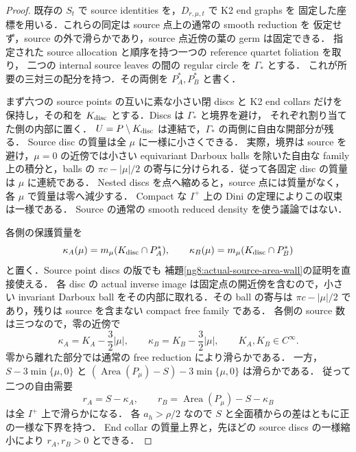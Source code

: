 \begin{proof}
既存の $S_t$ で source identities を，$D_{r,\mu,t}$ で K2 end graphs を
固定した座標を用いる．これらの同定は source 点上の通常の smooth reduction を
仮定せず，source の外で滑らかであり，source 点近傍の葉の germ は固定できる．
指定された source allocation と順序を持つ一つの reference quartet foliation を取り，
二つの internal source leaves の間の regular circle を $\Gamma_*$ とする．
これが所要の三対三の配分を持つ．その両側を $P_A^*,P_B^*$ と書く．

まず六つの source points の互いに素な小さい閉 discs と K2 end collars だけを
保持し，その和を $K_{\rm disc}$ とする．Discs は $\Gamma_*$ と境界を避け，
それぞれ割り当てた側の内部に置く．
$U=P\setminus K_{\rm disc}$ は連結で，$\Gamma_*$ の両側に自由な開部分が残る．
Source disc の質量は全 $\mu$ に一様に小さくできる．
実際，境界は source を避け，$\mu=0$ の近傍では小さい equivariant Darboux balls
を除いた自由な family 上の積分と，balls の
$\pi c-|\mu|/2$ の寄与に分けられる．従って各固定 disc の質量は $\mu$ に連続である．
Nested discs を点へ縮めると，source 点には質量がなく，各 $\mu$ で質量は零へ減少する．
Compact な $I^+$ 上の Dini の定理によりこの収束は一様である．
Source の通常の smooth reduced density を使う議論ではない．

各側の保護質量を
\[
 \kappa_A(\mu)=m_\mu(K_{\rm disc}\cap P_A^*),\qquad
 \kappa_B(\mu)=m_\mu(K_{\rm disc}\cap P_B^*)
\]
と置く．Source point discs の版でも
補題\ref{ng8:actual-source-area-wall}の証明を直接使える．
各 disc の actual inverse image は固定点の開近傍を含むので，小さい invariant
Darboux ball をその内部に取れる．その ball の寄与は
$\pi c-|\mu|/2$ であり，残りは source を含まない compact free family である．
各側の source 数は三つなので，零の近傍で
\[
 \kappa_A=K_A-\frac32|\mu|,\qquad
 \kappa_B=K_B-\frac32|\mu|,\qquad K_A,K_B\in C^\infty .
\]
零から離れた部分では通常の free reduction により滑らかである．
一方，$S-3\min\{\mu,0\}$ と
$(\operatorname{Area}(P_\mu)-S)-3\min\{\mu,0\}$ は滑らかである．
従って二つの自由需要
\[
 r_A=S-\kappa_A,\qquad
 r_B=\operatorname{Area}(P_\mu)-S-\kappa_B
\]
は全 $I^+$ 上で滑らかになる．
各 $a_h>\rho/2$ なので $S$ と全面積からの差はともに正の一様な下界を持つ．
End collar の質量上界と，先ほどの source discs の一様縮小により
$r_A,r_B>0$ とできる．


\end{proof}
